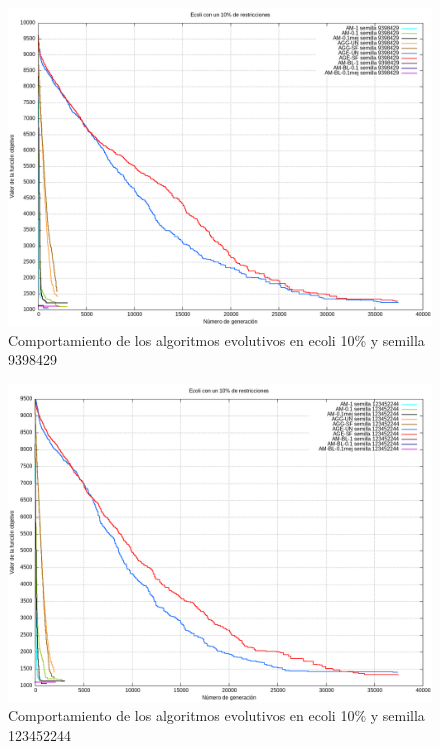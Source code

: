 \documentclass[12pt, spanish]{article}
\begin{document}
\begin{figure}[H]
  \centering
      \includegraphics[scale = 0.50]{ecoli_set_const_10_9398429.png}
 		 \caption{Comportamiento de los algoritmos evolutivos en ecoli 10\% y semilla 9398429}
  		\label{fig:g-213566}

\end{figure}


\begin{figure}[H]
  \centering
      \includegraphics[scale = 0.50]{ecoli_set_const_10_123452244.png}
 		 \caption{Comportamiento de los algoritmos evolutivos en ecoli 10\% y semilla 123452244}
  		\label{fig:g-213566}

\end{figure}
\end{document}
